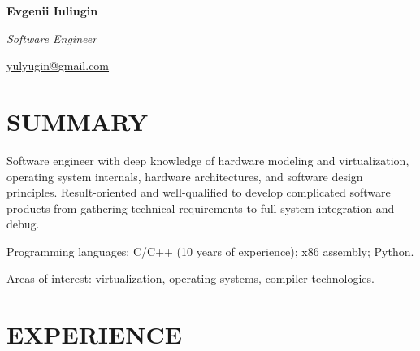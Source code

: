﻿\documentclass[12pt, a4paper, oneside]{article}
\begin{document}
\Huge
\textbf{Evgenii Iuliugin}

\Large
\textit{Software Engineer}

\begin{flushright}
  \large
  \href{mailto:yulyugin@gmail.com}{yulyugin@gmail.com}

\end{flushright}

\normalsize

\section*{SUMMARY}

Software engineer with deep knowledge of hardware modeling and virtualization,
operating system internals, hardware architectures, and software design
principles. Result-oriented and well-qualified to develop complicated software
products from gathering technical requirements to full system integration
and debug.

Programming languages: C/C++ (10 years of experience); x86 assembly; Python.

Areas of interest: virtualization, operating systems, compiler technologies.

\section*{EXPERIENCE}
\end{document}
